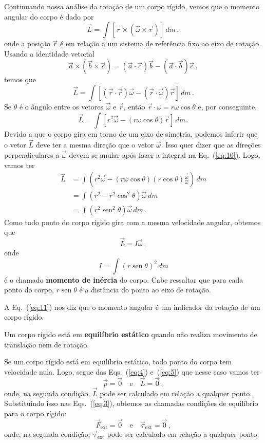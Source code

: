 \documentclass[papersize=a4,DIV=calc,twocolumn=on]{scrartcl}
\newcommand{\dpar}[1]{\left(#1\right)}
\theoremstyle{definition}
\DeclareMathOperator{\sen}{sen}
\begin{document}
Continuando nossa análise da rotação de um corpo rígido, vemos que o
momento angular do corpo é dado por
$$\vec L=\int [\vec r\times(\vec\omega\times\vec r)]\,dm\,,$$
onde a posição $\vec r$ é em relação a um sistema de referência fixo
ao eixo de rotação.  Usando a identidade vetorial
$$\vec a\times(\vec b\times\vec c)=(\vec a\cdot\vec c)\vec b-(\vec a\cdot\vec b)\vec c\,,$$
temos que
\begin{equation}
  \label{eq:10}
  \vec L=\int [(\vec r\cdot\vec r)\vec\omega-(\vec r\cdot\vec\omega)\vec r]\,dm\,.
\end{equation}
Se $\theta$ é o ângulo entre os vetores $\vec\omega$ e $\vec r$, então
$\vec r\cdot\omega=r\omega\cos\theta$ e, por conseguinte,
$$\vec L=\int [r^2\vec\omega-(r\omega\cos\theta)\vec r]\,dm\,.$$
Devido a que o corpo gira em torno de um eixo de simetria, podemos
inferir que o vetor $\vec L$ deve ter a mesma direção que o vetor
$\vec\omega$. Isso quer dizer que as direções perpendiculares a
$\vec\omega$ devem se anular após fazer a integral na
Eq.~(\ref{eq:10}). Logo, vamos ter
\begin{equation*}
  \begin{split}
    \vec L&=\int \dpar{r^2\vec\omega-(r\omega\cos\theta)(r\cos\theta)\frac{\vec\omega}{\omega}}\,dm\\
    &=\int (r^2-r^2\cos^2\theta)\vec\omega\,dm\\
    &=\int (r^2\sen^2\theta)\vec\omega\,dm\,.
  \end{split}
\end{equation*}
Como todo ponto do corpo rígido gira com a mesma velocidade angular,
obtemos que
\begin{equation}
  \label{eq:11}
  \vec L=I\vec\omega\,,
\end{equation}
onde
\begin{equation}
  \label{eq:12}
  I=\int (r\sen\theta)^2\,dm
\end{equation}
é o chamado \textbf{momento de inércia} do corpo. Cabe ressaltar que
para cada ponto do corpo, $r\sen\theta$ é a distância do ponto ao eixo
de rotação.

A Eq.~(\ref{eq:11}) nos diz que o momento angular é um indicador da
rotação de um corpo rígido.

Um corpo rígido está em \textbf{equilíbrio estático} quando não
realiza movimento de translação nem de rotação.

Se um corpo rígido está em equilíbrio estático, todo ponto do corpo
tem velocidade nula. Logo, segue das Eqs.~(\ref{eq:4}) e~(\ref{eq:5})
que nesse caso vamos ter
$$\vec p=\vec 0\quad\text{e}\quad\vec L=\vec 0\,,$$
onde, na segunda condição, $\vec L$ pode ser calculado em relação a
qualquer ponto. Substituindo isso nas Eqs.~(\ref{eq:3}), obtemos as
chamadas condições de equilíbrio para o corpo rígido:
\begin{equation}
  \label{eq:13}
  {\vec F}_{\mathrm{ext}}=\vec 0\quad\text{e}\quad \vec\tau_{\mathrm{ext}}=\vec 0\,,
\end{equation}
onde, na segunda condição, $\vec\tau_{\mathrm{ext}}$ pode ser
calculado em relação a qualquer ponto.
\end{document}
